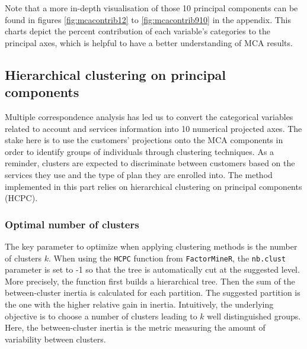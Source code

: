 \documentclass[
]{book}
\begin{document}
Note that a more in-depth visualisation of those 10 principal components can be found in figures \ref{fig:mcacontrib12} to \ref{fig:mcacontrib910} in the appendix. This charts depict the percent contribution of each variable's categories to the principal axes, which is helpful to have a better understanding of MCA results.

\hypertarget{hierarchical-clustering-on-principal-components}{%
\subsection{Hierarchical clustering on principal components}\label{hierarchical-clustering-on-principal-components}}

Multiple correspondence analysis has led us to convert the categorical variables related to account and services information into 10 numerical projected axes. The stake here is to use the customers' projections onto the MCA components in order to identify groups of individuals through clustering techniques. As a reminder, clusters are expected to discriminate between customers based on the services they use and the type of plan they are enrolled into. The method implemented in this part relies on hierarchical clustering on principal components (HCPC).

\hypertarget{optimal-number-of-clusters}{%
\subsubsection*{Optimal number of clusters}\label{optimal-number-of-clusters}}

The key parameter to optimize when applying clustering methods is the number of clusters \(k\). When using the \texttt{HCPC} function from \texttt{FactorMineR}, the \texttt{nb.clust} parameter is set to -1 so that the tree is automatically cut at the suggested level. More precisely, the function first builds a hierarchical tree. Then the sum of the between-cluster inertia is calculated for each partition. The suggested partition is the one with the higher relative gain in inertia. Intuitively, the underlying objective is to choose a number of clusters leading to \(k\) well distinguished groups. Here, the between-cluster inertia is the metric measuring the amount of variability between clusters.
\end{document}
